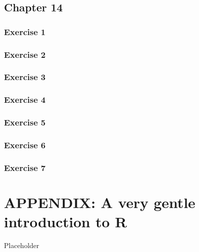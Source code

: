 \documentclass[a4paper,12pt,oneside]{book}
\begin{document}
\hypertarget{chapter-14}{%
\section{Chapter 14}\label{chapter-14}}

\hypertarget{exercise-1-8}{%
\subsection{Exercise 1}\label{exercise-1-8}}

\hypertarget{exercise-2-8}{%
\subsection{Exercise 2}\label{exercise-2-8}}

\hypertarget{exercise-3-7}{%
\subsection{Exercise 3}\label{exercise-3-7}}

\hypertarget{exercise-4-5}{%
\subsection{Exercise 4}\label{exercise-4-5}}

\hypertarget{exercise-5-3}{%
\subsection{Exercise 5}\label{exercise-5-3}}

\hypertarget{exercise-6-2}{%
\subsection{Exercise 6}\label{exercise-6-2}}

\hypertarget{exercise-7-1}{%
\subsection{Exercise 7}\label{exercise-7-1}}

\hypertarget{appendix-a-very-gentle-introduction-to-r}{%
\chapter{APPENDIX: A very gentle introduction to R}\label{appendix-a-very-gentle-introduction-to-r}}

Placeholder
\end{document}
